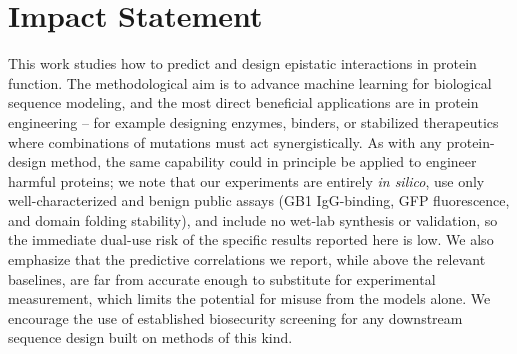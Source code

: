 \documentclass{article}
\begin{document}
\section*{Impact Statement}

This work studies how to predict and design epistatic interactions in protein
function. The methodological aim is to advance machine learning for biological
sequence modeling, and the most direct beneficial applications are in protein
engineering -- for example designing enzymes, binders, or stabilized therapeutics
where combinations of mutations must act synergistically. As with any protein-design
method, the same capability could in principle be applied to engineer harmful
proteins; we note that our experiments are entirely \emph{in silico}, use only
well-characterized and benign public assays (GB1 IgG-binding, GFP fluorescence, and
domain folding stability), and include no wet-lab synthesis or validation, so the
immediate dual-use risk of the specific results reported here is low. We also
emphasize that the predictive correlations we report, while above the relevant
baselines, are far from accurate enough to substitute for experimental measurement,
which limits the potential for misuse from the models alone. We encourage the use of
established biosecurity screening for any downstream sequence design built on methods
of this kind.



\end{document}

